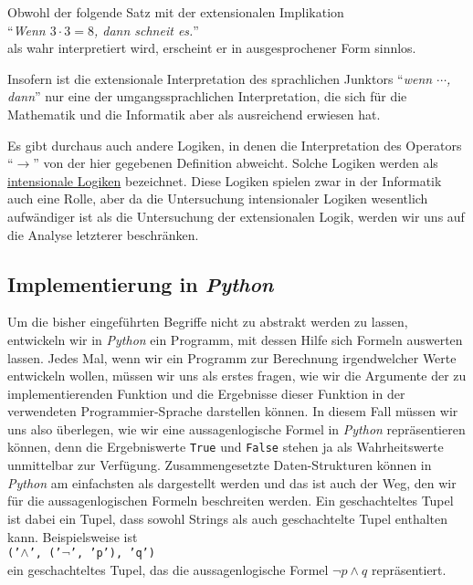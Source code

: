 Obwohl der folgende Satz mit der extensionalen Implikation 
\\[0.2cm]
\hspace*{1.3cm}
``\textsl{Wenn $3 \cdot 3 = 8$, dann schneit es.}''
\\[0.2cm]
als wahr interpretiert wird, erscheint er in ausgesprochener Form sinnlos.

Insofern ist die extensionale Interpretation des sprachlichen Junktors
``\textsl{wenn $\cdots$, dann}'' nur eine  der umgangssprachlichen Interpretation, die sich für die
Mathematik und die Informatik aber als ausreichend erwiesen hat.

Es gibt durchaus auch andere Logiken, in denen die Interpretation des Operators ``$\rightarrow$'' von der
hier gegebenen Definition abweicht.  Solche Logiken werden als
\href{https://en.wikipedia.org/wiki/Intensional_logic}{intensionale Logiken} bezeichnet.  Diese Logiken spielen
zwar in der Informatik auch eine Rolle, aber da die Untersuchung intensionaler Logiken wesentlich
aufwändiger ist als die Untersuchung der extensionalen Logik, werden wir uns auf die Analyse letzterer beschränken.

\subsection{Implementierung in \textsl{Python}} 
Um die bisher eingeführten Begriffe nicht zu abstrakt werden zu lassen,
entwickeln wir in \textsl{Python} ein Programm, mit dessen Hilfe sich Formeln
auswerten lassen.  
Jedes Mal, wenn wir ein Programm zur Berechnung irgendwelcher Werte entwickeln wollen,
müssen wir uns als erstes fragen, wie wir die Argumente der zu implementierenden Funktion und die
Ergebnisse dieser Funktion in der verwendeten Programmier-Sprache darstellen können.
In diesem Fall müssen wir uns also überlegen, wie wir eine
aussagenlogische Formel in \textsl{Python} repräsentieren können, denn die Ergebniswerte
\texttt{True} und \texttt{False} stehen ja als Wahrheitswerte unmittelbar zur Verfügung.
Zusammengesetzte Daten-Strukturen können in \textsl{Python} am einfachsten als
 dargestellt werden und das ist auch der Weg, den wir für
die aussagenlogischen Formeln beschreiten werden.  Ein geschachteltes Tupel ist dabei ein Tupel, dass
sowohl Strings als auch geschachtelte Tupel enthalten kann.  Beispiels\-weise ist
\\[0.2cm]
\hspace*{1.3cm}
\texttt{('$\wedge$', ('$\neg$', 'p'), 'q')}
\\[0.2cm]
ein geschachteltes Tupel, das die aussagenlogische Formel $\neg p \wedge q$ repräsentiert.


